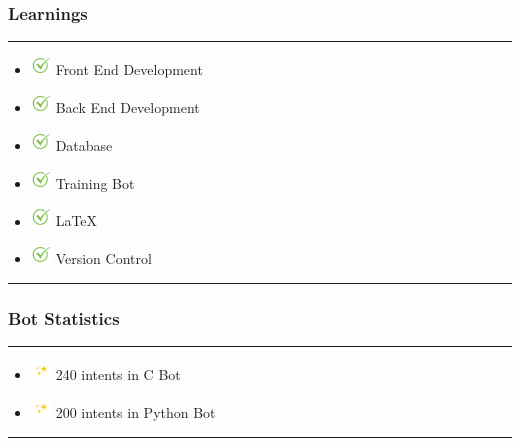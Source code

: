 \documentclass[14pt]{beamer}
\begin{document}
\begin{frame}
    \frametitle{Learnings}
    \noindent
    {\color{pink} \rule{\linewidth}{0.7mm} }
    \begin{itemize}
    \item [] \includegraphics[width=0.2in, height=0.2in]{./logos/check.png} Front End Development \\
        \pause
    \item [] \includegraphics[width=0.2in, height=0.2in]{./logos/check.png} Back End Development \\
        \pause
    \item [] \includegraphics[width=0.2in, height=0.2in]{./logos/check.png} Database\\
        \pause
    \item [] \includegraphics[width=0.2in, height=0.2in]{./logos/check.png} Training Bot \\
        \pause
   \item [] \includegraphics[width=0.2in, height=0.2in]{./logos/check.png} LaTeX\\
       \pause
   \item [] \includegraphics[width=0.2in, height=0.2in]{./logos/check.png} Version Control \\
\end{itemize}
\noindent
    {\color{pink} \rule{\linewidth}{0.7mm} }
\end{frame}


\begin{frame}
    \frametitle{Bot Statistics}
    \noindent
    {\color{pink} \rule{\linewidth}{0.7mm} }
	\begin{itemize} 
         \item [] \includegraphics[width=0.2in, height=0.2in]{./logos/sparkle.jpg} 240 intents in C Bot\\
             \pause
         \item [] \includegraphics[width=0.2in, height=0.2in]{./logos/sparkle.jpg} 200 intents in Python Bot\\
    \end{itemize}
    \noindent
    {\color{pink} \rule{\linewidth}{0.7mm} }
\end{frame}
\end{document}
